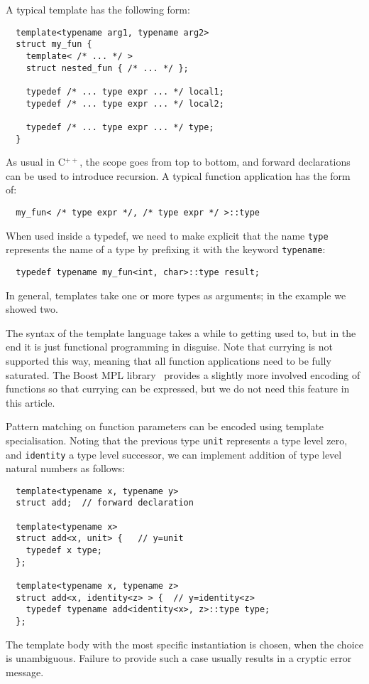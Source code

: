 \documentclass{llncs}
\newcommand*{\Cpp}{C\ensuremath{^{++}}}
\begin{document}
  A typical template has the following form:
  \begin{lstlisting}
  template<typename arg1, typename arg2>
  struct my_fun {
    template< /* ... */ >
    struct nested_fun { /* ... */ };

    typedef /* ... type expr ... */ local1;
    typedef /* ... type expr ... */ local2;

    typedef /* ... type expr ... */ type;
  }
  \end{lstlisting}
  As usual in \Cpp, the scope goes from top to bottom,
  and forward declarations can be used to introduce recursion.
  A typical function application has the form of:
  \begin{lstlisting}
  my_fun< /* type expr */, /* type expr */ >::type
  \end{lstlisting}
  When used inside a typedef, we need to make explicit that the
  name \lstinline$type$ represents the name of a type by prefixing
  it with the keyword \lstinline$typename$:
  \begin{lstlisting}
  typedef typename my_fun<int, char>::type result;
  \end{lstlisting}
  In general, templates take one or more types as arguments; in
  the example we showed two.

  The syntax of the template language takes a while to getting used to,
  but in the end it is just functional programming in disguise.
  Note that currying is not supported this way, meaning that all
  function applications need to be fully saturated. The Boost MPL
  library~\cite{boost} provides a slightly more involved encoding of functions
  so that currying can be expressed, but we do not need this
  feature in this article.

  Pattern matching on function parameters can be encoded using
  template specialisation. Noting that the previous type
  \lstinline$unit$ represents a type level zero, and
  \lstinline$identity$ a type level successor, we can implement
  addition of type level natural numbers as follows:
  \begin{lstlisting}
  template<typename x, typename y>
  struct add;  // forward declaration

  template<typename x>
  struct add<x, unit> {   // y=unit
    typedef x type;
  };

  template<typename x, typename z>
  struct add<x, identity<z> > {  // y=identity<z>
    typedef typename add<identity<x>, z>::type type;
  };
  \end{lstlisting}
  The template body with the most specific instantiation is
  chosen, when the choice is unambiguous. Failure to provide such a case
  usually results in a cryptic error message.
\end{document}
